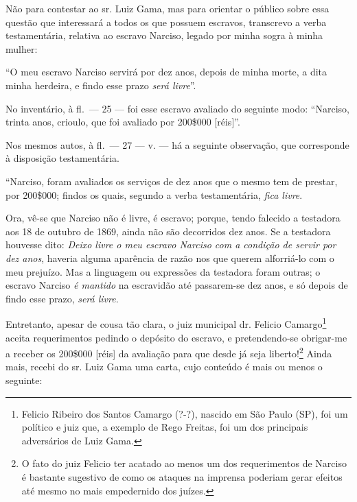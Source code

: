 {\asterisc{}

Não para contestar ao sr. Luiz Gama, mas para orientar o público sobre
essa questão que interessará a todos os que possuem escravos, transcrevo
a verba testamentária, relativa ao escravo Narciso, legado por minha
sogra à minha mulher:

``O meu escravo Narciso servirá por dez anos, depois de minha morte, a
dita minha herdeira, e findo esse prazo \emph{será livre}''.

No inventário, à fl.~--- 25 --- foi esse escravo avaliado do seguinte
modo: ``Narciso, trinta anos, crioulo, que foi avaliado por 200\$000
{[}réis{]}''.

Nos mesmos autos, à fl.~--- 27 --- v. --- há a seguinte observação, que
corresponde à disposição testamentária.

``Narciso, foram avaliados os serviços de dez anos que o mesmo tem de
prestar, por 200\$000; findos os quais, segundo a verba testamentária,
\emph{fica livre}.

Ora, vê-se que Narciso não é livre, é escravo; porque, tendo falecido a
testadora aos 18 de outubro de 1869, ainda não são decorridos dez anos.
Se a testadora houvesse dito: \emph{Deixo livre o meu escravo Narciso
com a condição de servir por dez anos}, haveria alguma aparência de
razão nos que querem alforriá-lo com o meu prejuízo. Mas a linguagem ou
expressões da testadora foram outras; o escravo Narciso \emph{é mantido}
na escravidão até passarem-se dez anos, e só depois de findo esse prazo,
\emph{será livre}.

Entretanto, apesar de cousa tão clara, o juiz municipal dr. Felicio
Camargo\footnote{ Felicio Ribeiro dos Santos Camargo (?-?), nascido
  em São Paulo (SP), foi um político e juiz que, a exemplo de Rego
  Freitas, foi um dos principais adversários de Luiz Gama.} aceita
requerimentos pedindo o depósito do escravo, e pretendendo-se obrigar-me
a receber os 200\$000 {[}réis{]} da avaliação para que desde já seja
liberto!\footnote{ O fato do juiz Felicio ter acatado ao menos um
  dos requerimentos de Narciso é bastante sugestivo de como os ataques
  na imprensa poderiam gerar efeitos até mesmo no mais empedernido dos
  juízes.} Ainda mais, recebi do sr. Luiz Gama uma carta, cujo conteúdo
é mais ou menos o seguinte:

}
